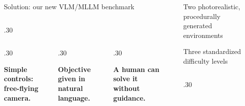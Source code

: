 \documentclass[final]{beamer}
\newlength{\sepwidth}
\newlength{\colwidth}
\newcommand{\separatorcolumn}{\begin{column}{\sepwidth}\end{column}}
\begin{document}
\begin{frame}[t]
\begin{columns}[t]
\begin{column}{\colwidth}
\begin{block}{Solution: our new VLM/MLLM benchmark}
\begin{columns}[t,totalwidth=\colwidth]
    \begin{column}{.30\colwidth}
    \begin{center}
     
    \end{center}
    \end{column}
    \end{columns}
    \vspace{.5cm}
    \begin{columns}[t,totalwidth=\colwidth]
    
    \begin{column}{.30\colwidth}
    \begin{center}
    \textbf{Simple controls: free-flying camera.}
    \end{center}
    \end{column}
    
    \begin{column}{.30\colwidth}
    \begin{center}
    \textbf{Objective given in natural language.}
    \end{center}
    \end{column}
    
    \begin{column}{.30\colwidth}
    \begin{center}
    \textbf{A human can solve it without guidance.}
    \end{center}
    \end{column}
    \end{columns}

\end{block}

\end{column}

\separatorcolumn

\begin{column}{\colwidth}
\begin{block}{Two photorealistic, procedurally generated environments}
    
\end{block}

\begin{block}{Three standardized difficulty levels}

\begin{columns}[t,totalwidth=\colwidth]

\begin{column}{.30\colwidth}
\begin{center}

\vspace{0.5cm}


\end{center}
\end{column}
\end{columns}
\end{block}
\end{column}
\end{columns}
\end{frame}
\end{document}
